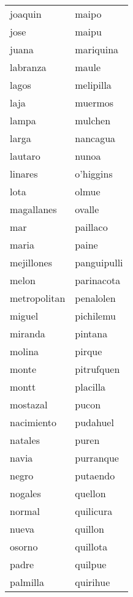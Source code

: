\begin{longtable}{l|l}
             joaquin   &  maipo   \\  
             jose   &  maipu   \\  
             juana   &  mariquina   \\  
             labranza   &  maule   \\  
             lagos   &  melipilla   \\  
             laja   &  muermos   \\  
             lampa   &  mulchen   \\  
             larga   &  nancagua   \\  
             lautaro   &  nunoa   \\  
             linares   &    o'higgins   \\  
             lota   &  olmue   \\  
             magallanes   &  ovalle   \\  
             mar   &  paillaco   \\  
             maria   &  paine   \\  
             mejillones   &  panguipulli   \\  
             melon   &  parinacota   \\  
             metropolitan   &  penalolen   \\  
             miguel   &  pichilemu   \\  
             miranda   &  pintana   \\  
             molina   &  pirque   \\  
             monte   &  pitrufquen   \\  
             montt   &  placilla   \\  
             mostazal   &  pucon   \\  
             nacimiento   &  pudahuel   \\  
             natales   &  puren   \\  
             navia   &  purranque   \\  
             negro   &  putaendo   \\  
             nogales   &  quellon   \\  
             normal   &  quilicura   \\  
             nueva   &  quillon   \\  
             osorno   &  quillota   \\  
             padre   &  quilpue   \\  
             palmilla   &  quirihue   \\  

\end{longtable}
